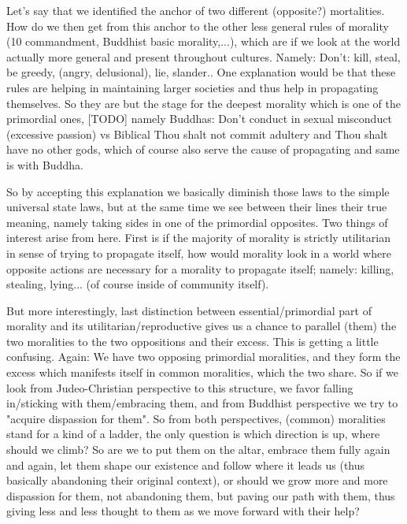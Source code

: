 \documentclass[10pt]{book}
\begin{document}
Let's say that we identified the anchor of two different (opposite?) mortalities. How do we then get from this anchor to the other less general rules of morality (10 commandment, Buddhist basic morality,...), which are if we look at the world actually more general and present throughout cultures. Namely: Don't: kill, steal, be greedy, (angry, delusional), lie, slander.. One explanation would be that these rules are helping in maintaining larger societies and thus help in propagating themselves. So they are but the stage for the deepest morality which is one of the primordial ones, [TODO] namely Buddhas: Don't conduct in sexual misconduct (excessive passion) vs Biblical Thou shalt not commit adultery and Thou shalt have no other gods, which of course also serve the cause of propagating and same is with Buddha.

So by accepting this explanation we basically diminish those laws to the simple universal state laws, but at the same time we see between their lines their true meaning, namely taking sides in one of the primordial opposites. Two things of interest arise from here. First is if the majority of morality is strictly utilitarian in sense of trying to propagate itself, how would morality look in a world where opposite actions are necessary for a morality to propagate itself; namely: killing, stealing, lying... (of course inside of community itself).  

But more interestingly, last distinction between essential/primordial part of morality and its utilitarian/reproductive gives us a chance to parallel (them) the two moralities to the two oppositions and their excess. This is getting a little confusing. Again: We have two opposing primordial moralities, and they form the excess which manifests itself in common moralities, which the two share. So if we look from Judeo-Christian perspective to this structure, we favor falling in/sticking with them/embracing them, and from Buddhist perspective we try to "acquire dispassion for them". So from both perspectives, (common) moralities stand for a kind of a ladder, the only question is which direction is up, where should we climb? So are we to put them on the altar, embrace them fully again and again, let them shape our existence and follow where it leads us (thus basically abandoning their original context), or should we grow more and more dispassion for them, not abandoning them, but paving our path with them, thus giving less and less thought to them as we move forward with their help?   
\end{document}
